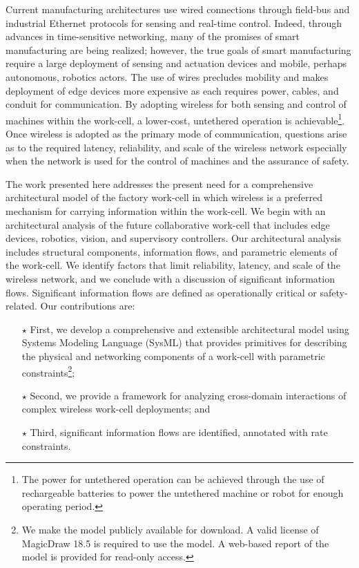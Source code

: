 \documentclass[journal, twoside]{IEEEtran}
\begin{document}
	Current manufacturing architectures use wired connections through field-bus and industrial Ethernet protocols for sensing and real-time control.  Indeed, through advances in time-sensitive networking, many of the promises of smart manufacturing are being realized; however, the true goals of smart manufacturing require a large deployment of sensing and actuation devices and mobile, perhaps autonomous, robotics actors.  The use of wires precludes mobility and makes deployment of edge devices more expensive as each  requires power, cables, and conduit for communication. By adopting wireless for both sensing and control of machines within the work-cell, a lower-cost, untethered operation is achievable\footnote{The power for untethered operation can be achieved through the use of rechargeable batteries to power the untethered machine or robot for enough operating period.}. Once wireless is adopted as the primary mode of communication, questions arise as to the required latency, reliability, and scale of the wireless network especially when the network is used for the control of machines and the assurance of safety. 
	
	The work presented here addresses the present need for a comprehensive architectural model of the factory work-cell in which wireless is a preferred mechanism for carrying information within the work-cell. We begin with an architectural analysis of the future collaborative work-cell that includes edge devices, robotics, vision, and supervisory controllers. Our architectural analysis includes structural components, information flows, and parametric elements of the work-cell. We identify factors that limit reliability, latency, and scale of the wireless network, and we conclude with a discussion of significant information flows. Significant information flows are defined as operationally critical or safety-related.  Our contributions are:
    
\begin{itemize}
\item[$\star$] First, we develop a comprehensive and extensible architectural model using Systems Modeling Language (SysML) that provides primitives for describing the physical and networking components of a work-cell with parametric constraints\footnote{We make the model publicly available for download. A valid license of MagicDraw 18.5 is required to use the model.  A web-based report of the model is provided for read-only access.};
\item[$\star$] Second, we provide a framework for analyzing cross-domain interactions of complex wireless work-cell deployments; and
\item[$\star$] Third, significant information flows are identified, annotated with rate constraints.
\end{itemize}
\end{document}
